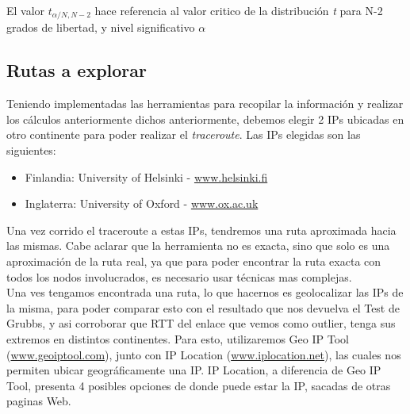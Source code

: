 El valor $t_{\alpha/N,N-2}$ hace referencia al valor critico de la distribución \textit{t} para N-2 grados de libertad, y nivel significativo $\alpha$

\subsection{Rutas a explorar}

Teniendo implementadas las herramientas para recopilar la información y realizar los cálculos anteriormente dichos anteriormente, debemos elegir 2 IPs ubicadas en otro continente para poder realizar el \textit{traceroute}. Las IPs elegidas son las siguientes:

\begin{itemize}
	\item Finlandia: University of Helsinki - \url{www.helsinki.fi}
	\item Inglaterra: University of Oxford - \url{www.ox.ac.uk}
\end{itemize}

Una vez corrido el traceroute a estas IPs, tendremos una ruta aproximada hacia las mismas. Cabe aclarar que la herramienta no es exacta, sino que solo es una aproximación de la ruta real, ya que para poder encontrar la ruta exacta con todos los nodos involucrados, es necesario usar técnicas mas complejas.\\

Una ves tengamos encontrada una ruta, lo que hacernos es geolocalizar las IPs de la misma, para poder comparar esto con el resultado que nos devuelva el Test de Grubbs, y asi corroborar que RTT del enlace que vemos como outlier, tenga sus extremos en distintos continentes. Para esto, utilizaremos Geo IP Tool (\url{www.geoiptool.com}), junto con IP Location (\url{www.iplocation.net}), las cuales nos permiten ubicar geográficamente una IP. IP Location, a diferencia de Geo IP Tool, presenta 4 posibles opciones de donde puede estar la IP, sacadas de otras paginas Web.










